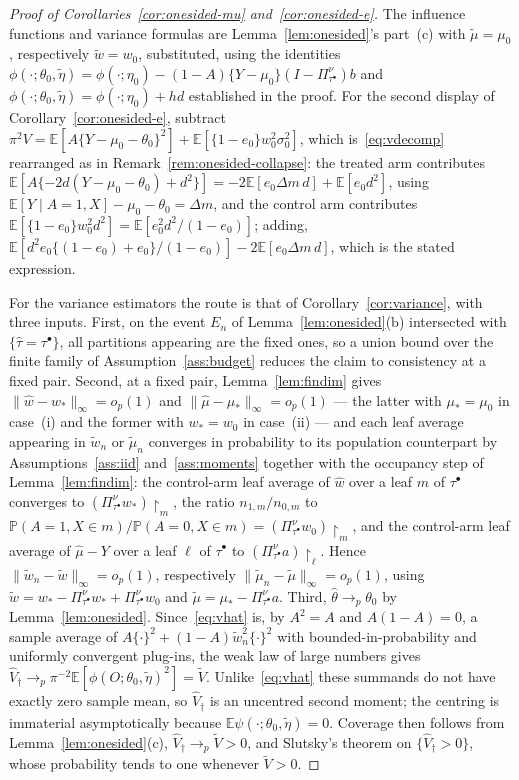 \documentclass[11pt]{article}
\theoremstyle{plain}
\theoremstyle{definition}
\theoremstyle{remark}
\newcommand{\E}{\mathbb{E}}
\newcommand{\PP}{\mathbb{P}}
\newcommand{\ez}{e_0}
\newcommand{\mz}{\mu_0}
\newcommand{\wz}{w_0}
\newcommand{\mhat}{\widehat{\mu}}
\newcommand{\what}{\widehat{w}}
\newcommand{\that}{\widehat{\tau}}
\newcommand{\thetahat}{\widehat{\theta}}
\newcommand{\Vhat}{\widehat{V}}
\newcommand{\Linf}[1]{\lVert #1 \rVert_{\infty}}
\newcommand{\etatil}{\widetilde{\eta}}
\newcommand{\wtil}{\widetilde{w}}
\newcommand{\mtil}{\widetilde{\mu}}
\newcommand{\Vtil}{\widetilde{V}}
\begin{document}
\begin{proof}[Proof of Corollaries~\ref{cor:onesided-mu}
and~\ref{cor:onesided-e}]
The influence functions and variance formulas are Lemma~\ref{lem:onesided}'s
part~(c) with $\mtil=\mz$, respectively $\wtil=\wz$, substituted, using the
identities $\phi(\cdot;\theta_0,\etatil)=\phi(\cdot;\eta_0)-(1-A)\{Y-\mz\}
(I-\Pi^\nu_{\tau^\bullet})b$ and
$\phi(\cdot;\theta_0,\etatil)=\phi(\cdot;\eta_0)+hd$ established in the proof.
For the second display of Corollary~\ref{cor:onesided-e}, subtract
$\pi^2V=\E[A\{Y-\mz-\theta_0\}^2]+\E[\{1-\ez\}\wz^2\sigma_0^2]$, which
is~\eqref{eq:vdecomp} rearranged as in
Remark~\ref{rem:onesided-collapse}: the treated arm contributes
$\E[A\{-2d(Y-\mz-\theta_0)+d^2\}]=-2\E[\ez\Delta m\,d]+\E[\ez d^2]$, using
$\E[Y\mid A=1,X]-\mz-\theta_0=\Delta m$, and the control arm contributes
$\E[\{1-\ez\}\wz^2d^2]=\E[\ez^2d^2/(1-\ez)]$; adding,
$\E[d^2\ez\{(1-\ez)+\ez\}/(1-\ez)]-2\E[\ez\Delta m\,d]$, which is the stated
expression.

For the variance estimators the route is that of
Corollary~\ref{cor:variance}, with three inputs. First, on the event $E_n$ of
Lemma~\ref{lem:onesided}(b) intersected with $\{\that=\tau^\bullet\}$, all
partitions appearing are the fixed ones, so a union bound over the finite family
of Assumption~\ref{ass:budget} reduces the claim to consistency at a fixed pair.
Second, at a fixed pair, Lemma~\ref{lem:findim} gives
$\Linf{\what-w_*}=o_p(1)$ and $\Linf{\mhat-\mu_*}=o_p(1)$ --- the latter with
$\mu_*=\mz$ in case~(i) and the former with $w_*=\wz$ in case~(ii) --- and each
leaf average appearing in $\wtil_n$ or $\mtil_n$ converges in probability to its
population counterpart by Assumptions~\ref{ass:iid} and~\ref{ass:moments}
together with the occupancy step of Lemma~\ref{lem:findim}: the control-arm leaf
average of $\what$ over a leaf $m$ of $\tau^\bullet$ converges to
$(\Pi^\nu_{\tau^\bullet}w_*)\restriction_m$, the ratio $n_{1,m}/n_{0,m}$ to
$\PP(A=1,X\in m)/\PP(A=0,X\in m)=(\Pi^\nu_{\tau^\bullet}\wz)\restriction_m$, and
the control-arm leaf average of $\mhat-Y$ over a leaf $\ell$ of $\tau^\bullet$
to $(\Pi^\nu_{\tau^\bullet}a)\restriction_\ell$. Hence
$\Linf{\wtil_n-\wtil}=o_p(1)$, respectively $\Linf{\mtil_n-\mtil}=o_p(1)$, using
$\wtil=w_*-\Pi^\nu_{\tau^\bullet}w_*+\Pi^\nu_{\tau^\bullet}\wz$ and
$\mtil=\mu_*-\Pi^\nu_{\tau^\bullet}a$. Third, $\thetahat\to_p\theta_0$ by
Lemma~\ref{lem:onesided}. Since~\eqref{eq:vhat} is, by $A^2=A$ and $A(1-A)=0$, a
sample average of $A\{\cdot\}^2+(1-A)\wtil_n^2\{\cdot\}^2$ with bounded-in-probability
and
uniformly convergent plug-ins, the weak law of large numbers gives
$\Vhat_\dagger\to_p\pi^{-2}\E[\phi(O;\theta_0,\etatil)^2]=\Vtil$. Unlike~\eqref{eq:vhat}
these summands do not have exactly zero sample mean, so $\Vhat_\dagger$ is an
uncentred second moment; the centring is immaterial asymptotically because
$\E\psi(\cdot;\theta_0,\etatil)=0$. Coverage then follows from
Lemma~\ref{lem:onesided}(c), $\Vhat_\dagger\to_p\Vtil>0$, and Slutsky's theorem
on
$\{\Vhat_\dagger>0\}$, whose probability tends to one whenever $\Vtil>0$.
\end{proof}
\end{document}
